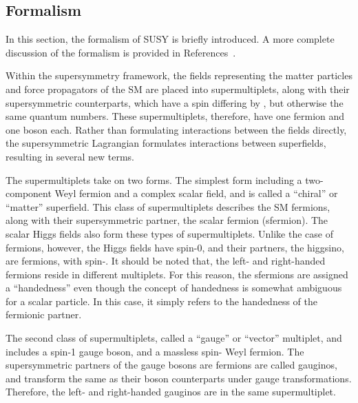 \subsection{Formalism}
\label{sec:susy_formalism}
In this section, the formalism of SUSY is briefly introduced.
A more complete discussion of the formalism is provided in
References~\cite{aitchison2007supersymmetry,Martin:1997ns,Polonsky:2001pn}.

Within the supersymmetry framework, the fields representing the matter
particles and force propagators of the SM are placed into supermultiplets,
along with their supersymmetric counterparts, which have a spin differing
by , but otherwise the same quantum numbers.
These supermultiplets, therefore, have one fermion and one boson each.
Rather than formulating interactions between the fields directly, the
supersymmetric Lagrangian formulates interactions between superfields,
resulting in several new terms.

The supermultiplets take on two forms.
The simplest form including a two-component Weyl fermion and a complex scalar
field, and is called a ``chiral'' or ``matter'' superfield.
This class of supermultiplets describes the SM fermions, along with their
supersymmetric partner, the scalar fermion (sfermion).
The scalar Higgs fields also form these types of supermultiplets.
Unlike the case of fermions, however, the Higgs fields have spin-0, and their
partners, the higgsino, are fermions, with spin-.
It should be noted that, the left- and right-handed fermions reside in
different multiplets.
For this reason, the sfermions are assigned a ``handedness'' even though
the concept of handedness is somewhat ambiguous for a scalar particle.
In this case, it simply refers to the handedness of the fermionic partner.

The second class of supermultiplets, called a ``gauge'' or ``vector''
multiplet, and includes a spin-1 gauge boson, and a massless
spin- Weyl fermion.
The supersymmetric partners of the gauge bosons are fermions are called
gauginos, and transform the same as their boson counterparts under gauge
transformations.
Therefore, the left- and right-handed gauginos are in the same supermultiplet.

